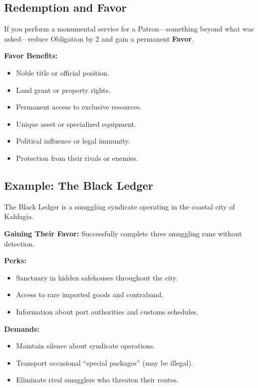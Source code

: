 \subsection{Redemption and Favor}
\label{sec:terrestrial-redemption}

If you perform a monumental service for a Patron—something beyond what was asked—reduce Obligation by 2 and gain a permanent \textbf{Favor}.

\textbf{Favor Benefits:}
\begin{itemize}
    \item Noble title or official position.
    \item Land grant or property rights.
    \item Permanent access to exclusive resources.
    \item Unique asset or specialized equipment.
    \item Political influence or legal immunity.
    \item Protection from their rivals or enemies.
\end{itemize}

\subsection{Example: The Black Ledger}
\label{sec:terrestrial-example}

The Black Ledger is a smuggling syndicate operating in the coastal city of Kahfagia.

\textbf{Gaining Their Favor:} Successfully complete three smuggling runs without detection.

\textbf{Perks:}
\begin{itemize}
    \item Sanctuary in hidden safehouses throughout the city.
    \item Access to rare imported goods and contraband.
    \item Information about port authorities and customs schedules.
\end{itemize}

\textbf{Demands:}
\begin{itemize}
    \item Maintain silence about syndicate operations.
    \item Transport occasional ``special packages'' (may be illegal).
    \item Eliminate rival smugglers who threaten their routes.
\end{itemize}


